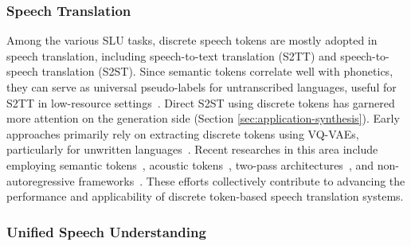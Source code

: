 \subsubsection{Speech Translation}
Among the various SLU tasks, discrete speech tokens are mostly adopted in speech translation, including speech-to-text translation (S2TT) and speech-to-speech translation (S2ST).
Since semantic tokens correlate well with phonetics, they can serve as universal pseudo-labels for untranscribed languages, useful for S2TT in low-resource settings~\cite{zhang-etal-2023-dub}.
Direct S2ST using discrete tokens has garnered more attention on the generation side (Section \ref{sec:application-synthesis}).
Early approaches primarily rely on extracting discrete tokens using VQ-VAEs, particularly for unwritten languages~\cite{tjandra2019speech, zhang2021uwspeech}. 
Recent researches in this area include employing semantic tokens~\cite{lee2022direct, lee-etal-2022-textless, wu2023speechgen}, acoustic tokens~\cite{peng2024mslm, wang-etal-2024-speech, gong2024seamlessexpressivelm}, two-pass architectures~\cite{chen-etal-2023-speech, inaguma-etal-2023-unity}, and non-autoregressive frameworks~\cite{huang2023transpeech}. 
These efforts collectively contribute to advancing the performance and applicability of discrete token-based speech translation systems.

\subsubsection{Unified Speech Understanding}

